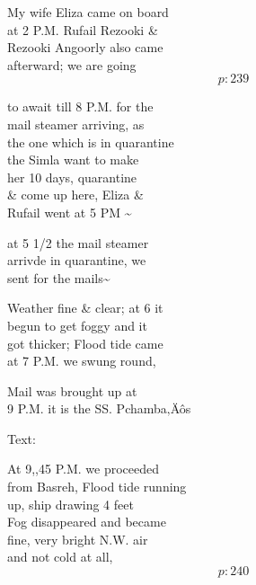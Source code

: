 \documentclass{report}
\begin{document}
	\par{
 	My wife Eliza came on board\ \\at 2 P.M. Rufail Rezooki \&\ \\Rezooki Angoorly also came\ \\afterward; we are going\ \\
  \[p: 239 \]

	}


	\par{
 	to await till 8 P.M. for the\ \\mail steamer arriving, as\ \\the one which is in quarantine\ \\the Simla want to make\ \\her 10 days, quarantine\ \\\& come up here, Eliza \&\ \\Rufail went at 5 PM \~{}\ \\
	}

	\par{
 	at 5 1/2 the mail steamer\ \\arrivde in quarantine, we\ \\sent for the mails\~{}\ \\
	}

	\par{
 	Weather fine \& clear; at 6 it\ \\begun to get foggy and it\ \\got thicker; Flood tide came\ \\at 7 P.M. we swung round,\ \\
	}

	\par{
 	Mail was brought up at\ \\9 P.M. it is the SS. Pchamba‚Äôs\ \\
	}

	\par{
 	Text:\ \\
	}

	\par{
 	At 9,,45 P.M. we proceeded\ \\from Basreh, Flood tide running\ \\up, ship drawing 4 feet\ \\Fog disappeared and became\ \\fine, very bright N.W. air\ \\and not cold at all,\ \\
  \[p: 240 \]

	}
\end{document}
